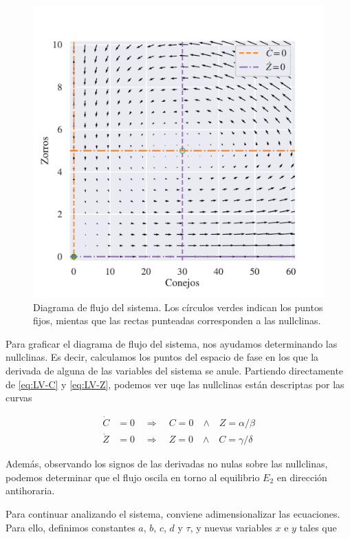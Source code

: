 \documentclass[10pt,twocolumn]{article}
\begin{document}
\begin{figure}[th]
\centering
\includegraphics[scale=0.45]{flujo.pdf}
\caption{\label{fig:flujo} Diagrama de flujo del sistema. Los círculos verdes indican los puntos fijos, mientas que las rectas punteadas corresponden a las nullclinas. }
\end{figure}


Para graficar el diagrama de flujo del sistema, nos ayudamos determinando las nullclinas. Es decir, calculamos los puntos del espacio de fase en los que la derivada de alguna de las variables del sistema se anule. Partiendo directamente de \ref{eq:LV-C} y \ref{eq:LV-Z}, podemos ver uqe las nullclinas están descriptas por las curvas


\begin{align}
\dot{C} &= 0\quad  \Rightarrow \quad C = 0 \quad \mathrm{\wedge}\quad Z = \alpha / \beta \\
\dot{Z} &= 0\quad  \Rightarrow \quad Z = 0 \quad \mathrm{\wedge}\quad C = \gamma / \delta 
\end{align}


Además, observando los signos de las derivadas no nulas sobre las nullclinas, podemos determinar que el flujo oscila en torno al equilibrio $E_2$ en dirección antihoraria.

Para continuar analizando el sistema, conviene adimensionalizar las ecuaciones. Para ello, definimos constantes $a$, $b$, $c$, $d$ y $\tau$, y nuevas variables $x$ e $y$ tales que
\end{document}
